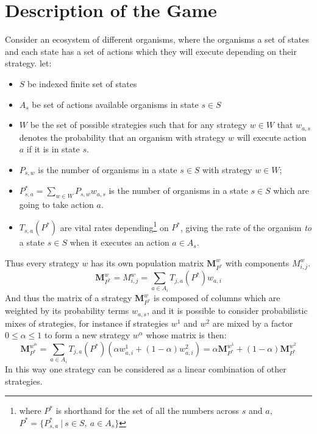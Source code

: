 \section{Description of the Game}\label{section:formalism}

Consider an ecosystem of different organisms, where the organisms a set of states and each state has a set of actions which they will execute depending on their strategy. let:

\begin{itemize}
\item	$S$ be indexed finite set of states
\item   $A_s$ be set of actions available organisms in state $s\in S$
\item   $W$ be the set of possible strategies such that for any strategy $w \in W$ that $w_{a,s}$ denotes the probability that an organism with strategy $w$ will execute action $a$ if it is in state $s$.
\item	$P_{s,w}$ is the number of organisms in a state $s\in S$ with strategy $w\in W$; 
\item   $P^*_{s,a} = \sum_{w\in W}P_{s,w}w_{a,s}$ is the number of organisms in a state $s\in S$ which are going to take action $a$.
\item   $T_{s,a}(P^*)$ are vital rates depending\footnote{where $P^*$ is shorthand for the set of all the numbers across $s$ and $a$,  $P^* = \{P^*_{s,a}~|~s\in S,~a\in A_s\}$} on $P^*$, giving the rate of the organism \textit{to} a state $s\in S$ when it executes an action $a\in A_s$.
\end{itemize}



Thus every strategy $w$ has its own population matrix $\mathbf{M}_{P^*}^w$ with components $M^{w}_{i,j}$.%
\begin{equation}\label{eq:transmission_matrix}\mathbf{M}_{P^*}^w = M^{w}_{i,j} = \sum_{a\in A_i}T_{j,a}(P^*) w_{a,i}\end{equation}
And thus the matrix of a strategy $\mathbf{M}_{P^*}^w$ is composed of columns which are weighted by its probability terms $w_{a,s}$,
and it is possible to consider probabilistic mixes of strategies, for instance if strategies $w^1$ and $w^2$ are mixed by a factor $0\le\alpha\le 1$ to form a new strategy $w^\alpha$ whose matrix is then:
\begin{equation}\label{eq:transmission_matrix2}\mathbf{M}_{P^*}^{w^\alpha} = \sum_{a\in A_i}T_{j,a}(P^*) \left(\alpha w^1_{a,i}+(1-\alpha)w^2_{a,i}\right) = \alpha\mathbf{M}_{P^*}^{w^1} + (1-\alpha)\mathbf{M}_{P^*}^{w^2}\end{equation}
In this way one strategy can be considered as a linear combination of other strategies.
